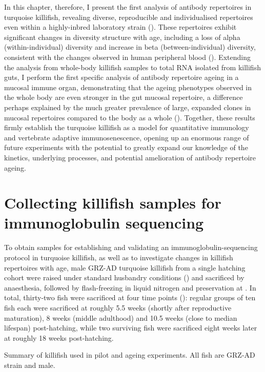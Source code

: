 In this chapter, therefore, I present the first analysis of antibody repertoires in turquoise killifish, revealing diverse, reproducible and individualised repertoires even within a highly-inbred laboratory strain (). These repertoires exhibit significant changes in diversity structure with age, including a loss of alpha (within-individual) diversity and increase in beta (between-individual) diversity, consistent with the changes observed in human peripheral blood (). Extending the analysis from whole-body killifish samples to total RNA isolated from killifish guts, I perform the first specific analysis of antibody repertoire ageing in a mucosal immune organ, demonstrating that the ageing phenotypes observed in the whole body are even stronger in the gut mucosal repertoire, a difference perhaps explained by the much greater prevalence of large, expanded clones in mucosal repertoires compared to the body as a whole (). Together, these results firmly establish the turquoise killifish as a model for quantitative immunology and vertebrate adaptive immunosenescence, opening up an enormous range of future experiments with the potential to greatly expand our knowledge of the kinetics, underlying processes, and potential amelioration of antibody repertoire ageing.

\section{Collecting killifish samples for immunoglobulin sequencing}
\label{sec:igseq_samples}

To obtain samples for establishing and validating an immunoglobulin-sequencing protocol in turquoise killifish, as well as to investigate changes in killifish repertoires with age, male GRZ-AD turquoise killifish from a single hatching cohort were raised under standard husbandry conditions () and sacrificed by anaesthesia, followed by flash-freezing in liquid nitrogen and preservation at . In total, thirty-two fish were sacrificed at four time points (): regular groups of ten fish each were sacrificed at roughly 5.5 weeks (shortly after reproductive maturation), 8 weeks (middle adulthood) and 10.5 weeks (close to median lifespan) post-hatching, while two surviving fish were sacrificed eight weeks later at roughly 18 weeks post-hatching.

\begin{table}[b]
\caption[Summary of killifish used in \igseq pilot and ageing experiments]{Summary of killifish used in \igseq pilot and ageing experiments. All fish are GRZ-AD strain and male.}
\label{tab:igseq-cohorts-summary}

\end{table}

